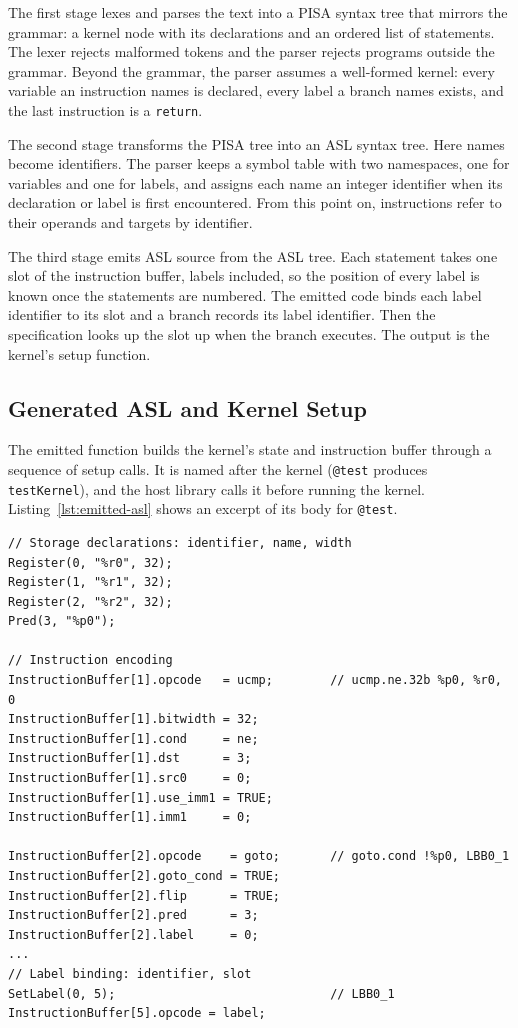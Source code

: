 The first stage lexes and parses the text into a PISA syntax tree that
mirrors the grammar: a kernel node with its declarations and an ordered
list of statements. The lexer rejects malformed tokens and the parser
rejects programs outside the grammar. Beyond the grammar, the parser
assumes a well-formed kernel: every variable an instruction names is
declared, every label a branch names exists, and the last instruction
is a \texttt{return}.

The second stage transforms the PISA tree into an ASL syntax tree. Here
names become identifiers. The parser keeps a symbol table with two
namespaces, one for variables and one for labels, and assigns each name an
integer identifier when its declaration or label is first encountered. From
this point on, instructions refer to their operands and targets by
identifier.

The third stage emits ASL source from the ASL tree. Each statement takes
one slot of the instruction buffer, labels included, so the position of
every label is known once the statements are numbered. The emitted code
binds each label identifier to its slot and a branch records its label
identifier. Then the specification looks up the slot up when the branch
executes. The output is the kernel's setup function.

\subsection{Generated ASL and Kernel Setup}
\label{sec:parser-output}

The emitted function builds the kernel's state and instruction buffer
through a sequence of setup calls. It is named after the kernel
(\texttt{@test} produces \texttt{testKernel}), and the host library calls
it before running the kernel. Listing~\ref{lst:emitted-asl} shows an
excerpt of its body for \texttt{@test}.

\begin{lstlisting}[caption={Excerpt of the ASL emitted for \texttt{@test}.
Comments added for presentation.}, label={lst:emitted-asl}]
// Storage declarations: identifier, name, width
Register(0, "%r0", 32);
Register(1, "%r1", 32);
Register(2, "%r2", 32);
Pred(3, "%p0");

// Instruction encoding
InstructionBuffer[1].opcode   = ucmp;        // ucmp.ne.32b %p0, %r0, 0
InstructionBuffer[1].bitwidth = 32;
InstructionBuffer[1].cond     = ne;
InstructionBuffer[1].dst      = 3;
InstructionBuffer[1].src0     = 0;
InstructionBuffer[1].use_imm1 = TRUE;
InstructionBuffer[1].imm1     = 0;

InstructionBuffer[2].opcode    = goto;       // goto.cond !%p0, LBB0_1
InstructionBuffer[2].goto_cond = TRUE;
InstructionBuffer[2].flip      = TRUE;
InstructionBuffer[2].pred      = 3;
InstructionBuffer[2].label     = 0;
...
// Label binding: identifier, slot
SetLabel(0, 5);                              // LBB0_1
InstructionBuffer[5].opcode = label;
\end{lstlisting}

